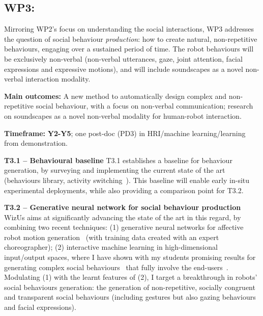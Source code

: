 \documentclass[11pt,a4paper]{report}
\newcommand{\project}{WizUs\xspace}
\begin{document}
\subsection{WP3: \textbf{\wpThree}} 

Mirroring WP2's focus on understanding the social interactions, WP3 addresses the
question of social behaviour \emph{production}: how to create natural,
non-repetitive behaviours, engaging over a sustained period of time. The robot
behaviours will be exclusively non-verbal (non-verbal utterances, gaze, joint
attention, facial expressions and expressive motions), and will include
soundscapes as a novel non-verbal interaction modality.

\begin{framed}

    \textbf{Main outcomes:} A new method to automatically design complex and
    non-repetitive social behaviour, with a focus on non-verbal communication;
    research on soundscapes as a novel non-verbal modality for human-robot
    interaction.

    \textbf{Timeframe:} \textbf{Y2-Y5}; one post-doc (PD3) in HRI/machine learning/learning from
demonstration.

\end{framed}

\textbf{T3.1 -- Behavioural baseline} T3.1 establishes a baseline for behaviour
generation, by surveying and implementing the current state of the art
(behaviours library, activity switching~\cite{coninx2016towards}). This
baseline will enable early in-situ experimental deployments, while also
providing a comparison point for T3.2.

\textbf{T3.2 -- Generative neural network for social behaviour production}
\project aims at significantly advancing the state of the art in this regard, by
combining two recent techniques: (1) generative neural networks for affective
robot motion generation~\cite{marmpena2019generating,suguitan2020moveae} (with
training data created with an expert choreographer); (2) interactive machine
learning in high-dimensional input/output spaces, where I have shown with my
students promising results for generating complex social
behaviours~\cite{senft2019teaching, winkle2020couch} that fully involve the
end-users~\cite{winkle2018social}. Modulating (1) with the learnt features of
(2), I target a breakthrough in robots' social behaviours generation: the
generation of non-repetitive, socially congruent and transparent social
behaviours (including gestures but also gazing behaviours and facial
expressions).
\end{document}
